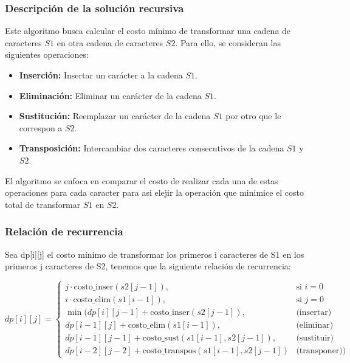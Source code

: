 
\subsubsection{Descripción de la solución recursiva}

Este algoritmo busca calcular el costo mínimo de transformar una cadena de caracteres $S1$ en otra 
cadena de caracteres $S2$. Para ello, se consideran las siguientes operaciones:
\begin{itemize}
    \item \textbf{Inserción:} Insertar un carácter a la cadena $S1$.
    \item \textbf{Eliminación:} Eliminar un carácter de la cadena $S1$.
    \item \textbf{Sustitución:} Reemplazar un carácter de la cadena $S1$ por otro que le correspon a $S2$.
    \item \textbf{Transposición:} Intercambiar dos caracteres consecutivos de la cadena $S1$ y $S2$.
\end{itemize}


El algoritmo se enfoca en comparar el costo de realizar cada una de estas operaciones para cada caracter para asi 
elejir la operación que minimice el costo total de transformar $S1$ en $S2$.

\subsubsection{Relación de recurrencia}

Sea dp[i][j] el costo mínimo de transformar los primeros i caracteres de S1 en los primeros j caracteres de S2, 
tenemos que la siguiente relación de recurrencia:

\[
dp[i][j] =
\begin{cases} 
    j \cdot \text{costo\_inser}(s2[j-1]), & \text{si } i = 0 \\
    i \cdot \text{costo\_elim}(s1[i-1]), & \text{si } j = 0 \\
    \min \bigg(
        dp[i][j-1] + \text{costo\_inser}(s2[j-1]), & \text{(insertar)} \\
        dp[i-1][j] + \text{costo\_elim}(s1[i-1]), & \text{(eliminar)} \\
        dp[i-1][j-1] + \text{costo\_sust}(s1[i-1], s2[j-1]), & \text{(sustituir)} \\
        dp[i-2][j-2] + \text{costo\_transpos}(s1[i-1], s2[j-1]) & \text{(transponer)} 
    \bigg)
\end{cases}
\]

